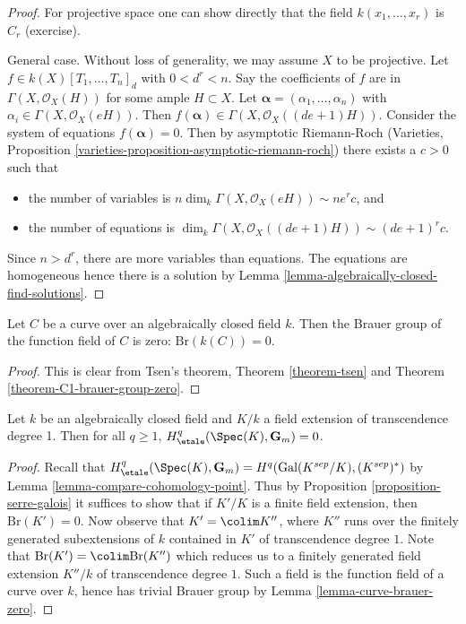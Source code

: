 \begin{proof}
For projective space one can show directly that the field
$k(x_1, \ldots, x_r)$ is $C_r$ (exercise).

\medskip\noindent
General case. Without loss of generality, we may assume $X$ to be projective.
Let $f \in k(X)[T_1, \ldots, T_n]_d$ with $0 < d^r < n$.
Say the coefficients of $f$ are in $\Gamma(X, \mathcal{O}_X(H))$
for some ample $H \subset X$. Let
$\mathbf{\alpha} = (\alpha_1, \ldots, \alpha_n)$ with $\alpha_i \in \Gamma(X,
\mathcal{O}_X(eH))$. Then $f(\mathbf{\alpha}) \in \Gamma(X,
\mathcal{O}_X((de + 1)H))$. Consider the system of equations $f(\mathbf{\alpha})
=0$. Then by asymptotic Riemann-Roch
(Varieties, Proposition \ref{varieties-proposition-asymptotic-riemann-roch})
there exists a $c > 0$ such that
\begin{itemize}
\item the number of variables is
$n\dim_k \Gamma(X, \mathcal{O}_X(eH)) \sim n e^r c$, and
\item the number of equations is
$\dim_k \Gamma(X, \mathcal{O}_X((de + 1)H)) \sim (de + 1)^r c$.
\end{itemize}
Since $n > d^r$, there are more variables than equations. The equations are
homogeneous hence there is a solution by
Lemma \ref{lemma-algebraically-closed-find-solutions}.
\end{proof}

\begin{lemma}
\label{lemma-curve-brauer-zero}
Let $C$ be a curve over an algebraically closed field $k$. Then
the Brauer group of the function field of $C$ is zero:
$\text{Br}(k(C)) = 0$.
\end{lemma}

\begin{proof}
This is clear from Tsen's theorem,
Theorem \ref{theorem-tsen} and
Theorem \ref{theorem-C1-brauer-group-zero}.
\end{proof}

\begin{lemma}
\label{lemma-cohomology-Gm-function-field-curve}
Let $k$ be an algebraically closed field and $K/k$ a field extension
of transcendence degree 1. Then for all $q \geq 1$,
$H_\etale^q(\Spec(K), \mathbf{G}_m) = 0$.
\end{lemma}

\begin{proof}
Recall that
$H_\etale^q(\Spec(K), \mathbf{G}_m) = H^q(\text{Gal}(K^{sep}/K), (K^{sep})^*)$
by Lemma \ref{lemma-compare-cohomology-point}.
Thus by Proposition \ref{proposition-serre-galois}
it suffices to show that if $K'/K$ is a finite field extension, then
$\text{Br}(K') = 0$. Now observe that $K' = \colim K''$, where $K''$ runs
over the finitely generated subextensions of $k$ contained in $K'$ of
transcendence degree $1$.
Note that $\text{Br}(K') = \colim \text{Br}(K'')$ which reduces us
to a finitely generated field extension $K''/k$ of transcendence
degree $1$. Such a field is the function field of a curve over $k$,
hence has trivial Brauer group by
Lemma \ref{lemma-curve-brauer-zero}.
\end{proof}






